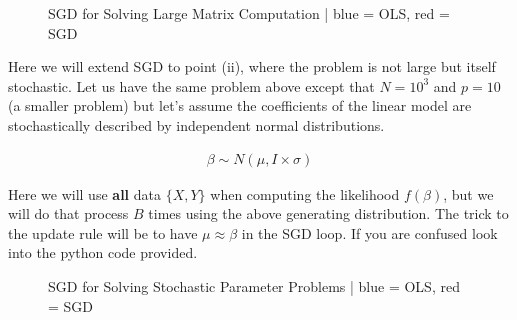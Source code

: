 \documentclass[12pt]{article}
\begin{document}
\begin{figure}[h]
\centering
{}
\caption{SGD for Solving Large Matrix Computation | blue = OLS, red = SGD}
\end{figure}

\vspace{5mm}

Here we will extend SGD to point (ii), where the problem is not large but itself stochastic. Let us have the same problem above except that $N=10^3$ and $p=10$ (a smaller problem) but let's assume the coefficients of the linear model are stochastically described by independent normal distributions.

\begin{align*}
\beta \sim N(\mu,I \times \sigma)
\end{align*}

\vspace{5mm}

Here we will use \textbf{all} data $\{X,Y\}$ when computing the likelihood $f(\beta)$, but we will do that process $B$ times using the above generating distribution. The trick to the update rule will be to have $\mu \approx \beta$ in the SGD loop. If you are confused look into the python code provided.

\begin{figure}[h]
\centering
{}
\caption{SGD for Solving Stochastic Parameter Problems | blue = OLS, red = SGD}
\end{figure}
\end{document}
